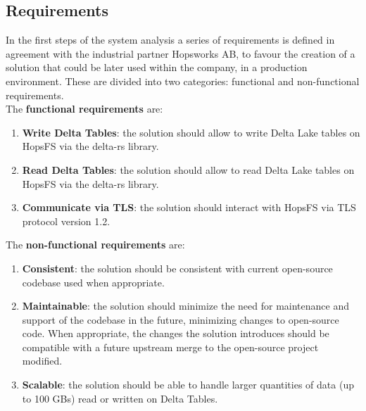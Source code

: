 \subsection{Requirements}
In the first steps of the system analysis a series of requirements is defined in agreement with the industrial partner Hopsworks AB, to favour the creation of a solution that could be later used within the company, in a production environment. These are divided into two categories: functional and non-functional requirements. \\ The \textbf{functional requirements} are:
\begin{enumerate}
    \item \textbf{Write Delta Tables}: the solution should allow to write Delta Lake tables on \gls{HopsFS} via the delta-rs library.
    \item \textbf{Read Delta Tables}: the solution should allow to read Delta Lake tables on \gls{HopsFS} via the delta-rs library.
    \item \textbf{Communicate via TLS}: the solution should interact with \gls{HopsFS} via \gls{TLS} protocol version 1.2.
\end{enumerate}
The \textbf{non-functional requirements} are:
\begin{enumerate}
    \item \textbf{Consistent}: the solution should be consistent with current open-source codebase used when appropriate.
    \item \textbf{Maintainable}: the solution should minimize the need for maintenance and support of the codebase in the future, minimizing changes to open-source code. When appropriate, the changes the solution introduces should be compatible with a future upstream merge to the open-source project modified.
    \item \textbf{Scalable}: the solution should be able to handle larger quantities of data (up to 100 GBs) read or written on Delta Tables.
\end{enumerate}

